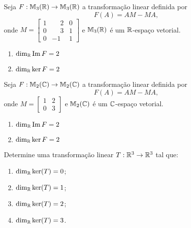 \documentclass[12pt]{exam}
\begin{document}
\begin{exercicio}
  Seja $F : \mathbb{M}_3(\mathbb{R}) \to \mathbb{M}_3(\mathbb{R})$ a transformação linear definida por
  \[
      F(A) = AM - MA,
  \]
  onde $M = \begin{bmatrix}
    1 & \phantom{-}2 & 0\\0 & \phantom{-}3 & 1\\0 & -1 & 1
  \end{bmatrix}$ e $\mathbb{M}_3(\mathbb{R})$ é um $\mathbb{R}$-espaço vetorial.
  \begin{solucao}
    \begin{enumerate}[label={\alph*})]
      \item $\dim_{\mathbb{R}}{\rm Im\,} F = 2$

      \item $\dim_{\mathbb{R}}\ker F = 2$
    \end{enumerate}
  \end{solucao}
\end{exercicio}

\begin{exercicio}\label{nucleo_imagem_fim}
  Seja $F : \mathbb{M}_2(\mathbb{C}) \to \mathbb{M}_2(\mathbb{C})$ a transformação linear definida por
  \[
      F(A) = AM - MA,
  \]
  onde $M = \begin{bmatrix}
    1 & 2\\0 & 3
  \end{bmatrix}$ e $\mathbb{M}_2(\mathbb{C})$ é um $\mathbb{C}$-espaço vetorial.
  \begin{solucao}
    \begin{enumerate}[label={\alph*})]
      \item $\dim_{\mathbb{R}}{\rm Im\,} F = 2$

      \item $\dim_{\mathbb{R}}\ker F = 2$
    \end{enumerate}
  \end{solucao}
\end{exercicio}

\begin{exercicio}
  Determine uma transformação linear $T : \mathbb{R}^3 \to \mathbb{R}^3$ tal que:
  \begin{enumerate}[label={\alph*})]
    \item $\dim_{\mathbb{R}} \ker(T) = 0$;

    \item $\dim_{\mathbb{R}} \ker(T) = 1$;

    \item $\dim_{\mathbb{R}} \ker(T) = 2$;

    \item $\dim_{\mathbb{R}} \ker(T) = 3$.
  \end{enumerate}
\end{exercicio}
\end{document}
